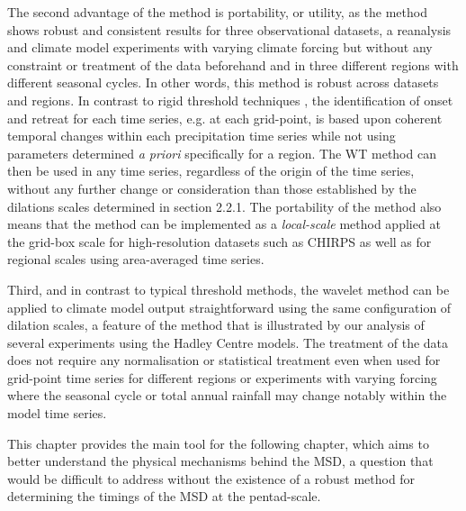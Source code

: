 The second advantage of the method is portability, or utility, as the method shows robust and consistent results for three observational datasets, a reanalysis and climate model experiments with varying climate forcing but without any constraint or treatment of the data beforehand and in three different regions with different seasonal cycles. In other words, this method is robust across datasets and regions. In contrast to rigid threshold techniques \citep[e.g.][]{liebmann2001interannual}, the identification of onset and retreat for each time series, e.g. at each grid-point, is based upon coherent temporal changes within each precipitation time series while not using parameters determined \textit{a priori} specifically for a region. The WT method can then be used in any time series, regardless of the origin of the time series, without any further change or consideration than those established by the dilations scales determined in section 2.2.1. 
The portability of the method also means that the method can be implemented as a \textit{local-scale} method applied at the grid-box scale for high-resolution datasets such as CHIRPS as well as for regional scales using area-averaged time series.

Third, and in contrast to typical threshold methods, the wavelet method can be applied to climate model output straightforward using the same configuration of dilation scales, a feature of the method that is illustrated by our analysis of several experiments using the Hadley Centre models. The treatment of the data does not require  any normalisation or statistical treatment even when used for grid-point time series for different regions or experiments with varying forcing where the seasonal cycle or total annual rainfall may change notably within the model time series.


This chapter provides the main tool for the following chapter, which aims to better understand the physical mechanisms behind the MSD, a question that would be difficult to address without the existence of a robust method for determining the timings of the MSD at the pentad-scale.
